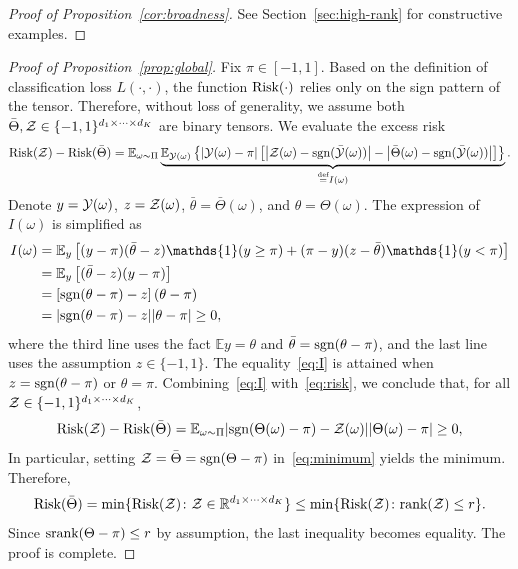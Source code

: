 \documentclass[11pt]{article}
\theoremstyle{plain}
\theoremstyle{definition}
\newcommand*{\KeepStyleUnderBrace}[1]{%
  \mathop{%
    \mathchoice
    {\underbrace{\displaystyle#1}}%
    {\underbrace{\textstyle#1}}%
    {\underbrace{\scriptstyle#1}}%
    {\underbrace{\scriptscriptstyle#1}}%
  }\limits
}
\def\sign{\textup{sgn}}
\def\srank{\textup{srank}}
\def\rank{\textup{rank}}
\def\risk{\textup{Risk}}
\begin{document}
\begin{proof}[Proof of Proposition~\ref{cor:broadness}]
See Section~\ref{sec:high-rank} for constructive examples.
\end{proof}

\begin{proof}[Proof of Proposition~\ref{prop:global}]
Fix $\pi\in[-1,1]$. Based on the definition of classification loss $L(\cdot,\cdot)$, the function $\risk(\cdot)$ relies only on the sign pattern of the tensor. Therefore, without loss of generality, we assume both $\bar \Theta, \mathcal{Z} \in\{-1,1\}^{d_1\times \cdots \times d_K}$ are binary tensors. 
We evaluate the excess risk 
\begin{equation}\label{eq:risk}
\risk(\tZ)- \risk(\bar \Theta) = \mathbb{E}_{\omega\sim \Pi}\KeepStyleUnderBrace{\mathbb{E}_{\tY(\omega)}\left\{|\tY(\omega)-\pi|\left[\left|\tZ(\omega)-\sign(\bar \tY(\omega)) \right|-\left|\bar\Theta(\omega)-\sign(\bar \tY(\omega))\right|\right]\right\}}_{\stackrel{\text{def}}{=}I(\omega)}.
\end{equation}
Denote $y=\mathcal{Y}(\omega)$, $z=\mathcal{Z}(\omega)$, $\bar \theta=\bar\Theta(\omega)$, and $\theta=\Theta(\omega)$. The expression of $I(\omega)$ is simplified as
\begin{align}\label{eq:I}
I(\omega)&= \mathbb{E}_{y}\left[ (y-\pi)(\bar \theta-z)\mathds{1}(y\geq \pi)+(\pi-y)(z-\bar \theta)\mathds{1}(y< \pi)\right]\notag \\
&= \mathbb{E}_{y}\left[(\bar \theta-z) (y-\pi)\right]\notag \\
&=  \left[\sign(\theta-\pi)-z\right]\left(\theta-\pi\right)\notag \\
&= |\sign(\theta-\pi)-z||\theta-\pi|\geq 0,
\end{align}
where the third line uses the fact $\mathbb{E}y=\theta$ and $\bar \theta=\sign(\theta-\pi)$, and the last line uses the assumption $z \in\{-1,1\}$. The equality~\eqref{eq:I} is attained when $z=\sign(\theta-\pi)$ or $\theta=\pi$. Combining~\eqref{eq:I} with~\eqref{eq:risk}, we conclude that, for all $\mathcal{Z}\in\{-1,1\}^{d_1\times \cdots \times d_K}$, 
\begin{equation}\label{eq:minimum}
\risk(\tZ)- \risk(\bar \Theta) = \mathbb{E}_{\omega\sim \Pi} |\sign(\Theta(\omega)-\pi)-\tZ(\omega)||\Theta(\omega)-\pi|\geq 0,
\end{equation}
In particular, setting $\tZ=\bar \Theta=\sign(\Theta-\pi)$ in~\eqref{eq:minimum} yields the minimum. Therefore, 
\[
\risk(\bar \Theta)=\min\{\risk(\tZ)\colon \tZ\in \mathbb{R}^{d_1\times \cdots \times d_K}\} \leq \min\{\risk(\tZ)\colon \rank(\tZ)\leq r\}.
\]
Since $\srank(\Theta-\pi)\leq r$ by assumption, the last inequality becomes equality. The proof is complete. 
\end{proof}
\end{document}
